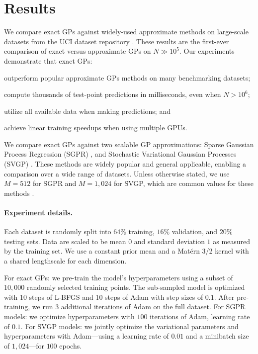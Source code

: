 \section{Results}
\label{sec:largeexact_results}

We compare exact GPs against widely-used approximate methods on large-scale datasets from the UCI dataset repository \cite{asuncion2007uci}.
These results are the first-ever comparison of exact versus approximate GPs on $N\gg 10^5$.
Our experiments demonstrate that exact GPs:
\begin{enumerate*}
  \item outperform popular approximate GPs methods on many benchmarking datasets;
  \item compute thousands of test-point predictions in milliseconds, even when $N > 10^6$;
  \item utilize all available data when making predictions; and
  \item achieve linear training speedups when using multiple GPUs.
\end{enumerate*}

We compare exact GPs against two scalable GP approximations: Sparse Gaussian Process Regression (SGPR) \cite{titsias2009variational}, and Stochastic Variational Gaussian Processes (SVGP) \cite{hensman2013gaussian}.
These methods are widely popular and general applicable, enabling a comparison over a wide range of datasets.
Unless otherwise stated, we use $M = 512$ for SGPR and $M = 1,\!024$ for SVGP, which are common values for these methods \cite{matthews2017gpflow}.

\paragraph{Experiment details.}
Each dataset is randomly split into $64\%$ training, $16\%$ validation, and $20\%$ testing sets.
Data are scaled to be mean $0$ and standard deviation $1$ as measured by the training set.
We use a constant prior mean and a Mat\'ern 3/2 kernel with a shared lengthscale for each dimension.

For exact GPs: we pre-train the model's hyperparameters using a subset of $10,\!000$ randomly selected training points.
The sub-sampled model is optimized with 10 steps of L-BFGS \citep{liu1989lbfgs} and 10 steps of Adam \citep{kingma2014adam} with step sizes of $0.1$.
After pre-training, we run 3 additional iterations of Adam on the full dataset.
For SGPR models: we optimize hyperparameters with $100$ iterations of Adam, learning rate of $0.1$.
For SVGP models: we jointly optimize the variational parameters and hyperparameters with Adam---using a learning rate of $0.01$ and a minibatch size of $1,\!024$---for $100$ epochs.

